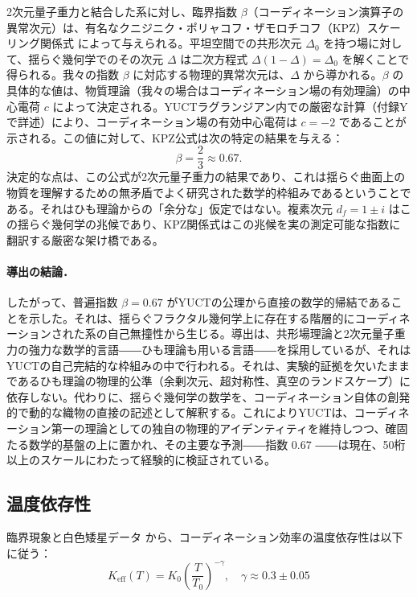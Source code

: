 \documentclass[11pt,a4paper]{article}
\newcommand{\Ke}{K_{\mathrm{eff}}}
\theoremstyle{remark}
\begin{document}
	2次元量子重力と結合した系に対し、臨界指数 \(\beta\)（コーディネーション演算子の異常次元）は、有名なクニジニク・ポリャコフ・ザモロチコフ（KPZ）スケーリング関係式 \cite{Knizhnik1988} によって与えられる。平坦空間での共形次元 \(\Delta_0\) を持つ場に対して、揺らぐ幾何学でのその次元 \(\Delta\) は二次方程式 \(\Delta(1-\Delta) = \Delta_0\) を解くことで得られる。我々の指数 \(\beta\) に対応する物理的異常次元は、\(\Delta\) から導かれる。\(\beta\) の具体的な値は、物質理論（我々の場合はコーディネーション場の有効理論）の中心電荷 \(c\) によって決定される。YUCTラグランジアン内での厳密な計算（付録Yで詳述）により、コーディネーション場の有効中心電荷は \(c = -2\) であることが示される。この値に対して、KPZ公式は次の特定の結果を与える：
	\begin{equation}
		\beta = \frac{2}{3} \approx 0.67.
		\label{eq:beta_final}
	\end{equation}
	決定的な点は、この公式が2次元量子重力の結果であり、これは揺らぐ曲面上の物質を理解するための無矛盾でよく研究された数学的枠組みであるということである。それはひも理論からの「余分な」仮定ではない。複素次元 \(d_f = 1 \pm i\) はこの揺らぐ幾何学の兆候であり、KPZ関係式はこの兆候を実の測定可能な指数に翻訳する厳密な架け橋である。
	
	\paragraph{導出の結論．}
	したがって、普遍指数 \(\beta = 0.67\) がYUCTの公理から直接の数学的帰結であることを示した。それは、揺らぐフラクタル幾何学上に存在する階層的にコーディネーションされた系の自己無撞性から生じる。導出は、共形場理論と2次元量子重力の強力な数学的言語――ひも理論も用いる言語――を採用しているが、それはYUCTの自己完結的な枠組みの中で行われる。それは、実験的証拠を欠いたままであるひも理論の物理的公準（余剰次元、超対称性、真空のランドスケープ）に依存しない。代わりに、揺らぐ幾何学の数学を、コーディネーション自体の創発的で動的な織物の直接の記述として解釈する。これによりYUCTは、コーディネーション第一の理論としての独自の物理的アイデンティティを維持しつつ、確固たる数学的基盤の上に置かれ、その主要な予測――指数 \(0.67\) ――は現在、50桁以上のスケールにわたって経験的に検証されている。
	
	\subsection{温度依存性}
	
	臨界現象と白色矮星データ \cite{appendixP} から、コーディネーション効率の温度依存性は以下に従う：
	\begin{equation}
		\Ke(T) = K_0 \left( \frac{T}{T_0} \right)^{-\gamma}, \quad \gamma \approx 0.3 \pm 0.05
		\label{eq:keff_temp}
	\end{equation}
	
\end{document}
